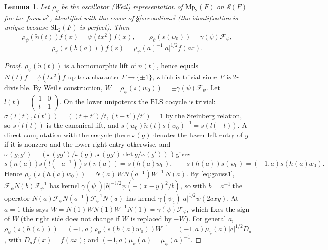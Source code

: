 \documentclass[11pt,oneside,notitlepage]{book}
\numberwithin{equation}{section}
\theoremstyle{plain}
\newtheorem{lemma}[theorem]{Lemma}
\theoremstyle{definition}
\newcommand{\SL}{\mathrm{SL}}
\newcommand{\Mp}{\mathrm{Mp}}
\newcommand{\cS}{\mathcal{S}}
\newcommand{\hil}[2]{(#1,#2)}
\begin{document}
\begin{lemma}\label{lem:oscillator}
Let $\rho_\psi$ be the oscillator (Weil) representation of $\Mp_2(F)$ on $\cS(F)$ for the form $x^2$, identified with the cover of \S\ref{sec:actions} (the identification is unique because $\SL_2(F)$ is perfect). Then
\[\rho_\psi(\tilde n(t))f(x)=\psi(tx^2)f(x),\qquad\rho_\psi(s(w_0))=\gamma(\psi)\mathcal F_\psi,\]\[\rho_\psi(s(h(a)))f(x)=\mu_\psi(a)^{-1}|a|^{1/2}f(ax).\]
\end{lemma}
\begin{proof}
$\rho_\psi(\tilde n(t))$ is a homomorphic lift of $n(t)$, hence equals $N(t)f=\psi(tx^2)f$ up to a character $F\to\{\pm1\}$, which is trivial since $F$ is $2$-divisible. By Weil's construction, $W=\rho_\psi(s(w_0))=\pm\gamma(\psi)\mathcal F_\psi$. Let $l(t)=\left(\begin{smallmatrix}1&0\\t&1\end{smallmatrix}\right)$. On the lower unipotents the BLS cocycle is trivial: $\sigma(l(t),l(t'))=\hil{(t+t')/t}{(t+t')/t'}=1$ by the Steinberg relation, so $s(l(t))$ is the canonical lift, and $s(w_0)\tilde n(t)s(w_0)^{-1}=s(l(-t))$. A direct computation with the cocycle (here $x(g)$ denotes the lower left entry of $g$ if it is nonzero and the lower right entry otherwise, and $\sigma(g,g')=\hil{x(gg')/x(g)}{x(gg')\det g/x(g')}$ \cite[(1.2)]{KM}) gives
\[s(n(a))s(l(-a^{-1}))s(n(a))=s(h(a)w_0),\qquad s(h(a))s(w_0)=\hil{-1}{a}s(h(a)w_0).\]
Hence $\rho_\psi(s(h(a)w_0))=N(a)\,W N(a^{-1})W^{-1}\,N(a)$. By \eqref{eq:gauss1}, $\mathcal F_\psi N(b)\mathcal F_\psi^{-1}$ has kernel $\gamma(\psi_b)|b|^{-1/2}\psi(-(x-y)^2/b)$, so with $b=a^{-1}$ the operator $N(a)\mathcal F_\psi N(a^{-1})\mathcal F_\psi^{-1}N(a)$ has kernel $\gamma(\psi_a)|a|^{1/2}\psi(2axy)$. At $a=1$ this says $W=N(1)WN(1)W^{-1}N(1)=\gamma(\psi)\mathcal F_\psi$, which fixes the sign of $W$ (the right side does not change if $W$ is replaced by $-W$). For general $a$, $\rho_\psi(s(h(a)))=\hil{-1}a\rho_\psi(s(h(a)w_0))W^{-1}=\hil{-1}a\mu_\psi(a)|a|^{1/2}D_a$, with $D_af(x)=f(ax)$; and $\hil{-1}a\mu_\psi(a)=\mu_\psi(a)^{-1}$.
\end{proof}
\end{document}
